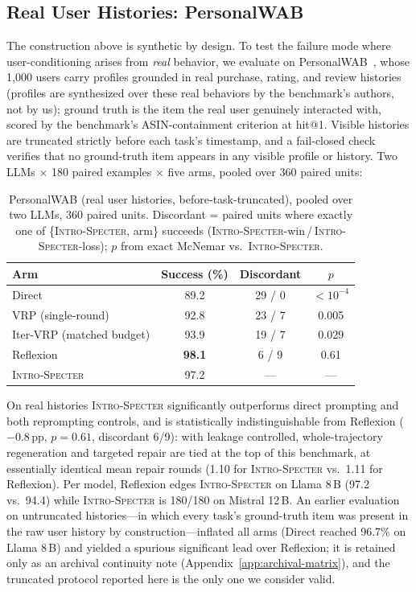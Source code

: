 \documentclass{article}
\newcommand{\method}{\textsc{Intro-Specter}\xspace}
\begin{document}

\subsection{Real User Histories: PersonalWAB}\label{sec:personalwab}

The construction above is synthetic by design. To test the failure mode where user-conditioning arises from \emph{real} behavior, we evaluate on PersonalWAB~\citep{cai2025personalwab}, whose 1{,}000 users carry profiles grounded in real purchase, rating, and review histories (profiles are synthesized over these real behaviors by the benchmark's authors, not by us); ground truth is the item the real user genuinely interacted with, scored by the benchmark's ASIN-containment criterion at hit@1. Visible histories are truncated strictly before each task's timestamp, and a fail-closed check verifies that no ground-truth item appears in any visible profile or history. Two LLMs $\times$ 180 paired examples $\times$ five arms, pooled over 360 paired units:

\begin{table}[t]\centering\small
\caption{PersonalWAB (real user histories, before-task-truncated), pooled over two LLMs, 360 paired units. Discordant = paired units where exactly one of \{\method{}, arm\} succeeds (\method-win\,/\,\method-loss); $p$ from exact McNemar vs.\ \method.}
\label{tab:personalwab}
\begin{tabular}{lccc}\toprule
Arm & Success (\%) & Discordant & $p$ \\\midrule
Direct              & 89.2 & 29 / 0 & $<10^{-4}$ \\
VRP (single-round)  & 92.8 & 23 / 7 & 0.005 \\
Iter-VRP (matched budget) & 93.9 & 19 / 7 & 0.029 \\
Reflexion           & \textbf{98.1} & 6 / 9 & 0.61 \\
\method             & 97.2 & --- & --- \\
\bottomrule\end{tabular}\end{table}

On real histories \method significantly outperforms direct prompting and both reprompting controls, and is statistically indistinguishable from Reflexion ($-0.8$\,pp, $p{=}0.61$, discordant 6/9): with leakage controlled, whole-trajectory regeneration and targeted repair are tied at the top of this benchmark, at essentially identical mean repair rounds (1.10 for \method vs.\ 1.11 for Reflexion). Per model, Reflexion edges \method on Llama 8\,B (97.2 vs.\ 94.4) while \method is 180/180 on Mistral 12\,B. An earlier evaluation on untruncated histories---in which every task's ground-truth item was present in the raw user history by construction---inflated all arms (Direct reached 96.7\% on Llama 8\,B) and yielded a spurious significant lead over Reflexion; it is retained only as an archival continuity note (Appendix~\ref{app:archival-matrix}), and the truncated protocol reported here is the only one we consider valid.
\end{document}
